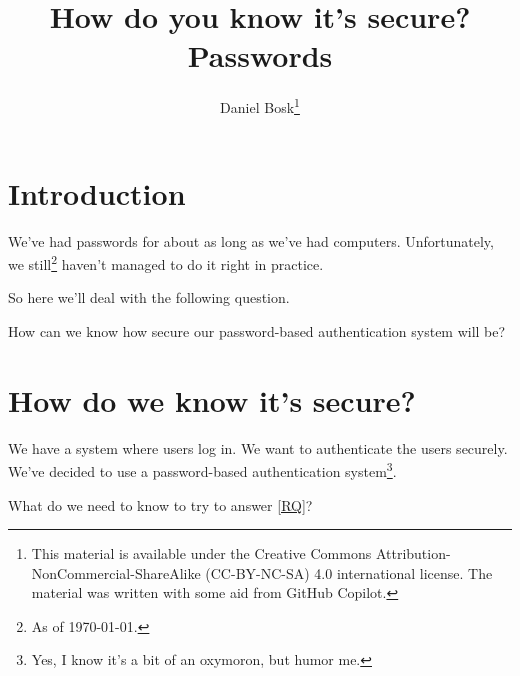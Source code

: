 \title{%
  How do you know it's secure?
  Passwords
}
\author{Daniel Bosk\thanks{%
    This material is available under the Creative Commons 
    Attribution-NonCommercial-ShareAlike (CC-BY-NC-SA) 4.0 international 
    license.
    The material was written with some aid from GitHub Copilot.
}}

\begin{frame}
  \maketitle
\end{frame}

\mode*

\begin{abstract}
  
\end{abstract}

\clearpage

\section{Introduction}

\begin{frame}
We've had passwords for about as long as we've had computers.
Unfortunately, we still\footnote{As of \today.} haven't managed to do it right 
in practice.
\end{frame}
So here we'll deal with the following question.

\begin{frame}
  \begin{question}\label{RQ}
    How can we know how secure our password-based authentication system will be?
  \end{question}
\end{frame}


\section{How do we know it's secure?}

\begin{frame}
We have a system where users log in.
We want to authenticate the users securely.
We've decided to use a password-based authentication system\footnote{%
  Yes, I know it's a bit of an oxymoron, but humor me.
}.
\end{frame}

\begin{frame}
  \begin{exercise}
    What do we need to know to try to answer \cref{RQ}?
  \end{exercise}
\end{frame}


